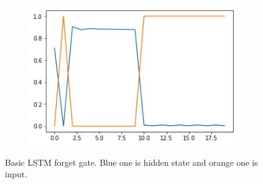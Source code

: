 \documentclass[12pt, letterpaper]{article}
\begin{document}
\begin{figure}[h]
    \begin{subfigure}[b]{0.3\textwidth}
        \includegraphics[width=\textwidth]{basic_f3}
        \label{fig:mouse}
    \end{subfigure}
    \caption{Basic LSTM forget gate. Blue one is hidden state and orange one is input.}\label{fig:animals}
\end{figure}
\end{document}
